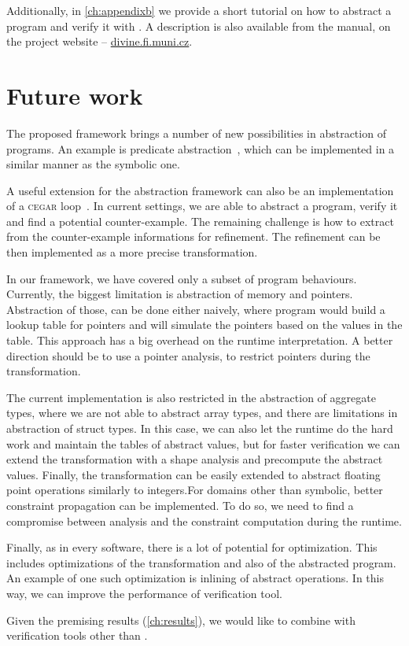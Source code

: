 Additionally, in \autoref{ch:appendixb} we provide a short tutorial on how to
abstract a program and verify it with \DIVINE. A description is also
available from the manual, on the project website -- \url{divine.fi.muni.cz}.

\section{Future work}

The proposed framework brings a number of new possibilities in abstraction of
programs. An example is predicate abstraction~\cite{Flanagan02}, which can be
implemented in a similar manner as the symbolic one.

A useful extension for the abstraction framework can also be an implementation
of a \textsc{cegar} loop~\cite{Clarke20}. In current settings, we are able to
abstract a program, verify it and find a potential counter-example. The
remaining challenge is how to extract from the counter-example informations
for refinement. The refinement can be then implemented as a more precise
transformation.

In our framework, we have covered only a subset of program behaviours.
Currently, the biggest limitation is abstraction of memory and pointers.
Abstraction of those, can be done either naively, where program would build
a lookup table for pointers and will simulate the pointers based
on the values in the table. This approach has a big overhead on the runtime
interpretation. A better direction should be to use a pointer analysis, to
restrict pointers during the transformation.

The current implementation is also restricted in the abstraction of aggregate
types, where we are not able to abstract array types, and there are limitations
in abstraction of struct types. In this case, we can also let the runtime do the
hard work and maintain the tables of abstract values, but for faster
verification we can extend the transformation with a shape analysis and
precompute the abstract values. Finally, the transformation can be easily
extended to abstract floating point operations similarly to integers.For domains
other than symbolic, better constraint propagation can be implemented. To do so,
we need to find a compromise between analysis and the constraint
computation during the runtime.

Finally, as in every software, there is a lot of potential for optimization.
This includes optimizations of the transformation and also of the abstracted program.
An example of one such optimization is inlining of abstract operations. In this
way, we can improve the performance of verification tool.

Given the premising results (\autoref{ch:results}), we would like to combine
\LART with verification tools other than \DIVINE.

